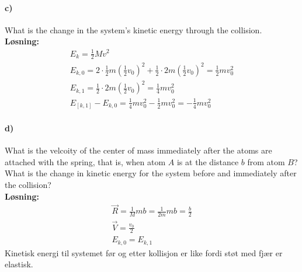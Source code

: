 \documentclass[11pt, A4paper,norsk]{article}
\begin{document}
		\paragraph{c)}
			\begin{flushleft}
What is the change in the system's kinetic energy through the collision. \\
\vspace{1mm}
\textbf{Løsning:} \\
\vspace{1mm}
				\begin{align}
E_k = \frac{1}{2}Mv^2 \nonumber \\
E_{k,0} = 2 \cdot \frac{1}{2} m(\frac{1}{2}v_0)^2 + \frac{1}{2} \cdot 2m(\frac{1}{2}v_0)^2 = \frac{1}{2}mv_0^2 \nonumber \\
E_{k,1} = \frac{1}{2} \cdot 2m(\frac{1}{2}v_0)^2 = \frac{1}{4}mv_0^2 \nonumber \\
E_[k,1] - E_{k,0} = \frac{1}{4}mv_0^2 - \frac{1}{2}mv_0^2 = - \frac{1}{4}mv_0^2 \nonumber 
				\end{align}
			\end{flushleft}









		\paragraph{d)}
			\begin{flushleft}
What is the velcoity of the center of mass immediately after the atoms are attached with the spring, that is, when atom $A$ is at the distance $b$ from atom $B$? What is the change in kinetic energy for the system before and immediately after the collision? \\
\vspace{1mm}
\textbf{Løsning:} \\
\vspace{1mm}
				\begin{align}
\vec{R} = \frac{1}{M}mb = \frac{1}{2m}mb = \frac{b}{2} \nonumber \\
\vec{V} = \frac{v_0}{2} \nonumber \\
E_{k,0} = E_{k,1} \nonumber
				\end{align}
Kinetisk energi til systemet før og etter kollisjon er like fordi støt med fjær er elastisk.
			\end{flushleft}
\end{document}
